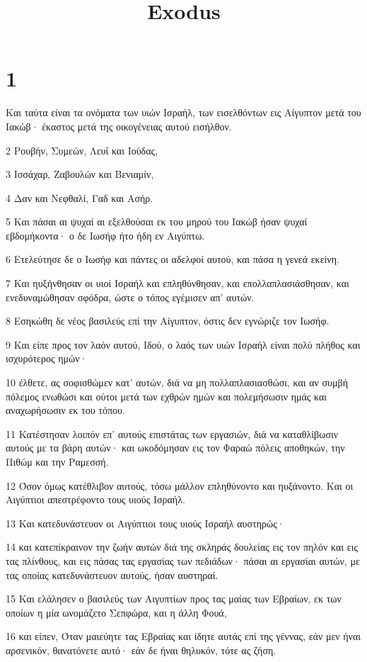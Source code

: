 

\title{Exodus}


\chapter{1}

\par Και ταύτα είναι τα ονόματα των υιών Ισραήλ, των εισελθόντων εις Αίγυπτον μετά του Ιακώβ· έκαστος μετά της οικογένειας αυτού εισήλθον.
\par 2 Ρουβήν, Συμεών, Λευΐ και Ιούδας,
\par 3 Ισσάχαρ, Ζαβουλών και Βενιαμίν,
\par 4 Δαν και Νεφθαλί, Γαδ και Ασήρ.
\par 5 Και πάσαι αι ψυχαί αι εξελθούσαι εκ του μηρού του Ιακώβ ήσαν ψυχαί εβδομήκοντα· ο δε Ιωσήφ ήτο ήδη εν Αιγύπτω.
\par 6 Ετελεύτησε δε ο Ιωσήφ και πάντες οι αδελφοί αυτού, και πάσα η γενεά εκείνη.
\par 7 Και ηυξήνθησαν οι υιοί Ισραήλ και επληθύνθησαν, και επολλαπλασιάσθησαν, και ενεδυναμώθησαν σφόδρα, ώστε ο τόπος εγέμισεν απ' αυτών.
\par 8 Εσηκώθη δε νέος βασιλεύς επί την Αίγυπτον, όστις δεν εγνώριζε τον Ιωσήφ.
\par 9 Και είπε προς τον λαόν αυτού, Ιδού, ο λαός των υιών Ισραήλ είναι πολύ πλήθος και ισχυρότερος ημών·
\par 10 έλθετε, ας σοφισθώμεν κατ' αυτών, διά να μη πολλαπλασιασθώσι, και αν συμβή πόλεμος ενωθώσι και ούτοι μετά των εχθρών ημών και πολεμήσωσιν ημάς και αναχωρήσωσιν εκ του τόπου.
\par 11 Κατέστησαν λοιπόν επ' αυτούς επιστάτας των εργασιών, διά να καταθλίβωσιν αυτούς με τα βάρη αυτών· και ωκοδόμησαν εις τον Φαραώ πόλεις αποθηκών, την Πιθώμ και την Ραμεσσή.
\par 12 Όσον όμως κατέθλιβον αυτούς, τόσω μάλλον επληθύνοντο και ηυξάνοντο. Και οι Αιγύπτιοι απεστρέφοντο τους υιούς Ισραήλ.
\par 13 Και κατεδυνάστευον οι Αιγύπτιοι τους υιούς Ισραήλ αυστηρώς·
\par 14 και κατεπίκραινον την ζωήν αυτών διά της σκληράς δουλείας εις τον πηλόν και εις τας πλίνθους, και εις πάσας τας εργασίας των πεδιάδων· πάσαι αι εργασίαι αυτών, με τας οποίας κατεδυνάστευον αυτούς, ήσαν αυστηραί.
\par 15 Και ελάλησεν ο βασιλεύς των Αιγυπτίων προς τας μαίας των Εβραίων, εκ των οποίων η μία ωνομάζετο Σεπφώρα, και η άλλη Φουά,
\par 16 και είπεν, Όταν μαιεύητε τας Εβραίας και ίδητε αυτάς επί της γέννας, εάν μεν ήναι αρσενικόν, θανατόνετε αυτό· εάν δε ήναι θηλυκόν, τότε ας ζήση.
